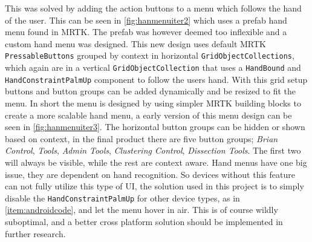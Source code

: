 This was solved by adding the action buttons to a menu which follows the hand of the user. This can be seen in \autoref{fig:hanmenuiter2} which uses a prefab hand menu found in MRTK. The prefab was however deemed too inflexible and a custom hand menu was designed. This new design uses default MRTK \texttt{PressableButtons} grouped by context in horizontal \texttt{GridObjectCollections}, which again are in a vertical \texttt{GridObjectCollection} that uses a \texttt{HandBound} and \texttt{HandConstraintPalmUp} component to follow the users hand. With this grid setup buttons and button groups can be added dynamically and be resized to fit the menu. In short the menu is designed by using simpler MRTK building blocks to create a more scalable hand menu, a early version of this menu design can be seen in \autoref{fig:hanmenuiter3}. The horizontal button groups can be hidden or shown based on context, in the final product there are five button groups; \textit{Brian Control}, \textit{Tools}, \textit{Admin Tools}, \textit{Clustering Control}, \textit{Dissection Tools}. The first two will always be visible, while the rest are context aware.
Hand menus have one big issue, they are dependent on hand recognition. So devices without this feature can not fully utilize this type of UI, the solution used in this project is to simply disable the \texttt{HandConstraintPalmUp} for other device types, as in \autoref{item:androidcode}, and let the menu hover in air. This is of course wildly suboptimal, and a better cross platform solution should be implemented in further research.


